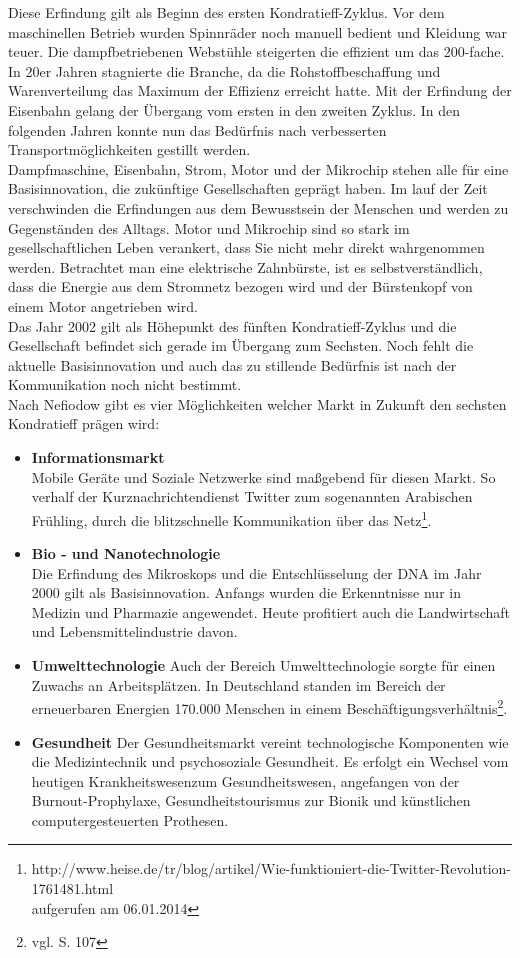 Diese Erfindung gilt als Beginn des ersten Kondratieff-Zyklus. Vor dem maschinellen Betrieb wurden Spinnräder noch manuell bedient und Kleidung war teuer. Die dampfbetriebenen Webstühle steigerten
die effizient um das 200-fache. In 20er Jahren stagnierte die Branche, da die Rohstoffbeschaffung und Warenverteilung das Maximum der Effizienz erreicht hatte. Mit der Erfindung der Eisenbahn gelang der Übergang vom ersten in den zweiten Zyklus. In den folgenden Jahren konnte nun das Bedürfnis nach verbesserten Transportmöglichkeiten gestillt werden.\\
Dampfmaschine, Eisenbahn, Strom, Motor und der Mikrochip stehen alle für eine Basisinnovation, die zukünftige Gesellschaften geprägt haben. Im lauf der Zeit verschwinden die Erfindungen aus dem Bewusstsein der Menschen und werden zu Gegenständen des Alltags. Motor und Mikrochip sind so stark im gesellschaftlichen Leben verankert, dass Sie nicht mehr direkt wahrgenommen werden. Betrachtet man eine elektrische Zahnbürste, ist es selbstverständlich, dass die Energie aus dem Stromnetz bezogen wird und der Bürstenkopf von einem Motor angetrieben wird.\\
Das Jahr 2002 gilt als Höhepunkt des fünften Kondratieff-Zyklus und die Gesellschaft befindet sich gerade im Übergang zum Sechsten. Noch fehlt die aktuelle Basisinnovation und auch das zu stillende Bedürfnis ist nach der Kommunikation noch nicht bestimmt.\\
Nach Nefiodow \cite{nefiodow:gesundheit} gibt es vier Möglichkeiten welcher Markt in Zukunft den sechsten Kondratieff prägen wird:
\begin{itemize}
  \item \textbf{Informationsmarkt} \\
  		Mobile Geräte und Soziale Netzwerke sind maßgebend für diesen Markt. So verhalf der Kurznachrichtendienst Twitter zum sogenannten \glqq Arabischen Frühling\grqq, durch die blitzschnelle Kommunikation über das Netz\footnote{http://www.heise.de/tr/blog/artikel/Wie-funktioniert-die-Twitter-Revolution-1761481.html \\aufgerufen am 06.01.2014}.
  \item \textbf{Bio - und Nanotechnologie} \\
  		Die Erfindung des Mikroskops und die Entschlüsselung der DNA im Jahr 2000 gilt als Basisinnovation. Anfangs wurden die Erkenntnisse nur in Medizin und Pharmazie angewendet. Heute profitiert auch die Landwirtschaft und Lebensmittelindustrie davon.
  \item \textbf{Umwelttechnologie}
  		Auch der Bereich Umwelttechnologie sorgte für einen Zuwachs an Arbeitsplätzen. In Deutschland standen im Bereich der erneuerbaren Energien 170.000 Menschen in einem Beschäftigungsverhältnis\footnote{vgl. \cite{nefiodow:gesundheit} S. 107}.
  \item \textbf{Gesundheit}
  		Der Gesundheitsmarkt vereint technologische Komponenten wie die Medizintechnik und psychosoziale Gesundheit. Es erfolgt ein Wechsel vom heutigen \glqq Krankheitswesen\grqq zum Gesundheitswesen, angefangen von der Burnout-Prophylaxe, Gesundheitstourismus zur Bionik und künstlichen computergesteuerten Prothesen.
\end{itemize}

